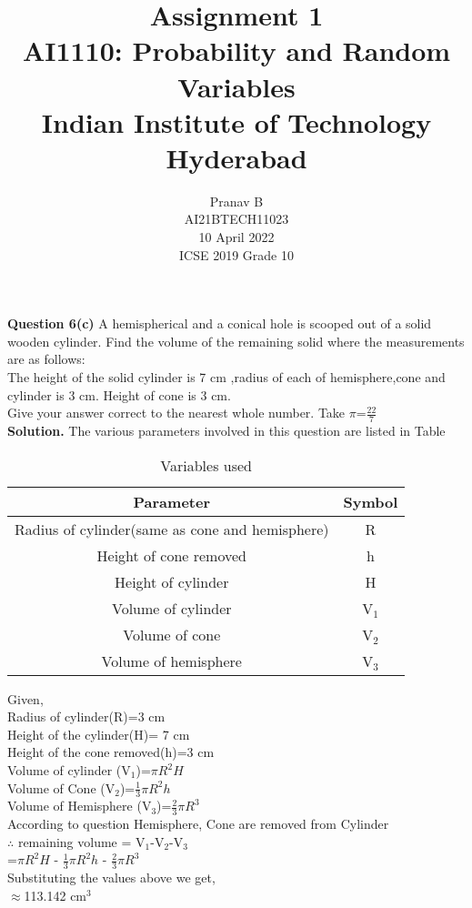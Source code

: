 \documentclass[journal,12pt,twocolumn]{IEEEtran}
\title{Assignment 1 \\ \Large AI1110: Probability and Random Variables \\ \large Indian Institute of Technology Hyderabad}
\author{Pranav B \\ \normalsize AI21BTECH11023 \\ \vspace*{20pt} \normalsize  10 April 2022 \\ \vspace*{20pt} \Large ICSE 2019 Grade 10}
\begin{document}
	\maketitle
	
	\textbf{Question 6(c)} 
	A hemispherical and a conical hole is scooped out of a solid wooden cylinder. Find the volume of the remaining solid where the measurements are as follows:\\
	The height of the solid cylinder is 7 cm ,radius of each of hemisphere,cone and cylinder is 3 cm. Height of cone is 3 cm.\\
	Give your answer correct to the nearest whole number. Take $\pi$=$\frac{22}{7}$\\
	\textbf{Solution.}
	The various parameters involved in this question are listed in Table \begin{table}[h]
\caption{Variables used}
\begin{tabular}{|c|c|}
\hline
Parameter & Symbol\\
\hline
Radius of cylinder(same as cone and hemisphere) & R\\
\hline
Height of cone removed & h \\
\hline
Height of cylinder & H  \\
\hline
Volume of cylinder & V$_1$ \\
\hline
Volume of cone  & V$_2$\\
\hline
Volume of hemisphere & V$_3$\\
\hline
\end{tabular}
\end{table}
	
	Given,\\
Radius of cylinder(R)=3 cm\\
Height of the cylinder(H)= 7 cm\\
Height of the cone removed(h)=3 cm\\
Volume of cylinder (V$_1$)=$\pi R^2 H$\\
Volume of Cone (V$_2$)=$\frac{1}{3} \pi R^2 h$\\
Volume of Hemisphere (V$_3$)=$\frac{2}{3} \pi R^3$\\
According to question Hemisphere, Cone are removed from Cylinder\\
$\therefore$ remaining volume = V$_1$-V$_2$-V$_3$\\
=$\pi R^2 H$ - $\frac{1}{3} \pi R^2 h$ - $\frac{2}{3} \pi R^3$\\
Substituting the values above we get,\\
$\approx$113.142 cm$^3$	
			
\end{document}
